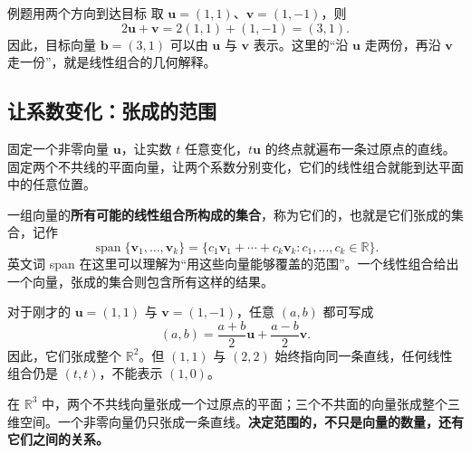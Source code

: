 \documentclass[a4paper,12pt,twoside,openany,fontset=none]{ctexbook}
\newcounter{example}[chapter]
\newenvironment{example}[1][]{\begin{exBox}{例题}{#1}}{\end{exBox}}
\numberwithin{equation}{chapter}
\begin{document}
\begin{example}[用两个方向到达目标]
取 $\boldsymbol{u}=(1,1)$、$\boldsymbol{v}=(1,-1)$，则
\[
    2\boldsymbol{u}+\boldsymbol{v}
    =2(1,1)+(1,-1)=(3,1).
\]
因此，目标向量 $\boldsymbol{b}=(3,1)$ 可以由 $\boldsymbol{u}$ 与 $\boldsymbol{v}$ 表示。这里的“沿 $\boldsymbol{u}$ 走两份，再沿 $\boldsymbol{v}$ 走一份”，就是线性组合的几何解释。
\end{example}



\subsection*{让系数变化：张成的范围}

固定一个非零向量 $\boldsymbol{u}$，让实数 $t$ 任意变化，$t\boldsymbol{u}$ 的终点就遍布一条过原点的直线。固定两个不共线的平面向量，让两个系数分别变化，它们的线性组合就能到达平面中的任意位置。

一组向量的\textbf{所有可能的线性组合所构成的集合}，称为它们的，也就是它们张成的集合，记作
\[
    \operatorname{span}\{\boldsymbol{v}_1,\ldots,\boldsymbol{v}_k\}
    =\{c_1\boldsymbol{v}_1+\cdots+c_k\boldsymbol{v}_k:
        c_1,\ldots,c_k\in\mathbb{R}\}.
\]
英文词 span 在这里可以理解为“用这些向量能够覆盖的范围”。一个线性组合给出一个向量，张成的集合则包含所有这样的结果。

对于刚才的 $\boldsymbol{u}=(1,1)$ 与 $\boldsymbol{v}=(1,-1)$，任意 $(a,b)$ 都可写成
\[
    (a,b)=\frac{a+b}{2}\boldsymbol{u}+\frac{a-b}{2}\boldsymbol{v}.
\]
因此，它们张成整个 $\mathbb{R}^2$。但 $(1,1)$ 与 $(2,2)$ 始终指向同一条直线，任何线性组合仍是 $(t,t)$，不能表示 $(1,0)$。

在 $\mathbb{R}^3$ 中，两个不共线向量张成一个过原点的平面；三个不共面的向量张成整个三维空间。一个非零向量仍只张成一条直线。\textbf{决定范围的，不只是向量的数量，还有它们之间的关系。}
\end{document}
